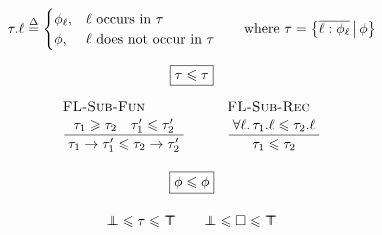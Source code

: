 $$ 
\begin{array}{c}
\flproj{\tau}{\ell} \defeq \begin{cases}
    \phi_\ell, & \ell \text{ occurs in } \tau \\
    \phi, & \ell \text{ does not occur in } \tau
\end{cases} \qquad \text{where } \tau = \flext{ \overline{\ell : \phi_\ell}}{\phi}
\\[1.5em]
\boxed{\tau \sub \tau}
\\[0.5em]
\irule{FL-Sub-Fun}{\tau_1 \super \tau_2 \quad \tau_1' \sub \tau_2'}{\tau_1 \to \tau_1' \sub \tau_2 \to \tau_2'}
\qquad
\irule{FL-Sub-Rec}{\forall \ell \ldotp \flproj{\tau_1}{\ell} \sub \flproj{\tau_2}{\ell}}{\tau_1 \sub \tau_2}
\\[2.5em]
\boxed{\phi \sub \phi}
\\[1em]
\flfbot \sub \tau \sub \flftop \qquad \flfbot \sub \flabsent \sub \flftop
\end{array} 
$$